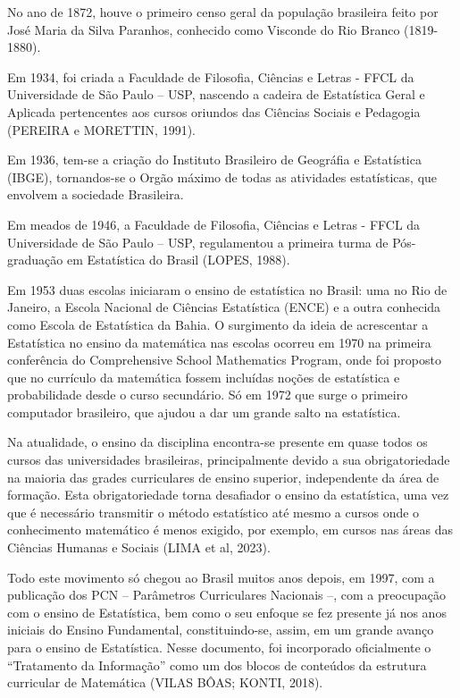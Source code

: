 No ano de 1872, houve o primeiro censo geral da população brasileira feito por José Maria da Silva Paranhos, conhecido como Visconde do Rio Branco (1819-1880).\vskip0.3cm 

Em 1934, foi criada a Faculdade de Filosofia, Ciências e Letras - FFCL da Universidade de São Paulo – USP, nascendo a cadeira de Estatística Geral e Aplicada pertencentes aos cursos oriundos das Ciências Sociais e Pedagogia (PEREIRA e MORETTIN, 1991).\vskip0.3cm

Em 1936, tem-se a criação do Instituto Brasileiro de Geográfia e Estatística (IBGE), tornandos-se o Orgão máximo de todas as atividades estatísticas, que envolvem a sociedade Brasileira.\vskip0.3cm

Em meados de 1946, a Faculdade de Filosofia, Ciências e Letras - FFCL da Universidade de São Paulo – USP, regulamentou a primeira turma de Pós-graduação em Estatística do Brasil (LOPES, 1988).\vskip0.3cm

Em 1953 duas escolas iniciaram o ensino de estatística no Brasil: uma no Rio de Janeiro, a Escola Nacional de Ciências Estatística (ENCE) e a outra conhecida como Escola de Estatística da Bahia. O surgimento da ideia de acrescentar a Estatística no ensino da matemática nas escolas ocorreu em 1970 na primeira conferência do Comprehensive School Mathematics Program, onde foi proposto que no currículo da matemática fossem incluídas noções de estatística e probabilidade desde o curso secundário. Só em 1972 que surge o primeiro computador brasileiro, que ajudou a dar um grande salto na estatística.\vskip0.3cm


Na atualidade, o ensino da disciplina encontra-se presente em quase todos os cursos das universidades brasileiras, principalmente devido a sua obrigatoriedade na maioria das grades curriculares de ensino superior, independente da área de formação. Esta obrigatoriedade torna desafiador o ensino da estatística, uma vez que é necessário transmitir o método estatístico até mesmo a cursos onde o conhecimento matemático é menos exigido, por exemplo, em cursos nas áreas das Ciências Humanas e Sociais (LIMA et al, 2023).\vskip0.3cm

\newpage
Todo este movimento só chegou ao Brasil muitos anos depois, em 1997, com a publicação dos PCN – Parâmetros Curriculares Nacionais –, com a preocupação com o ensino de Estatística, bem como o seu enfoque se fez presente já nos anos iniciais do Ensino Fundamental, constituindo-se, assim, em um grande avanço para o ensino de Estatística. Nesse documento, foi incorporado oficialmente o “Tratamento da Informação” como um dos blocos de conteúdos da estrutura curricular de Matemática (VILAS BÔAS; KONTI, 2018).\vskip0.3cm


